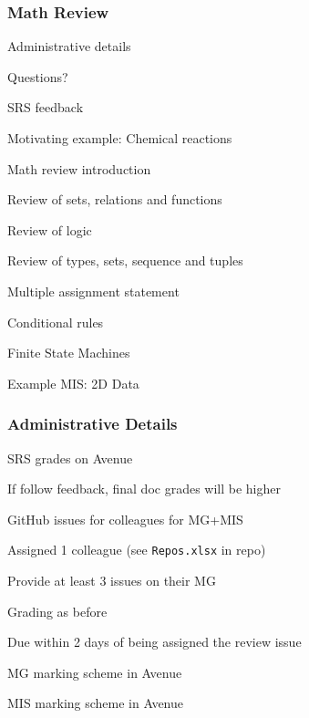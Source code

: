 \documentclass[t,12pt,numbers,fleqn]{beamer}
\begin{document}



\begin{frame}
\frametitle{Math Review}

\bi
\item Administrative details
\item Questions?
\item SRS feedback
\item Motivating example: Chemical reactions
\item Math review introduction
\item Review of sets, relations and functions
\item Review of logic
\item Review of types, sets, sequence and tuples
\item Multiple assignment statement
\item Conditional rules
\item Finite State Machines
\item Example MIS: 2D Data
\ei
\end{frame}


\begin{frame}
\frametitle{Administrative Details}

\bi
\item SRS grades on Avenue
\item If follow feedback, final doc grades will be higher
\item GitHub issues for colleagues for MG+MIS
\bi
\item Assigned 1 colleague (see \texttt{Repos.xlsx} in repo)
\item Provide at least 3 issues on their MG
\item Grading as before
\item Due within 2 days of being assigned the review issue
\ei
\item MG marking scheme in Avenue
\item MIS marking scheme in Avenue
\ei

\end{frame}

\end{document}
